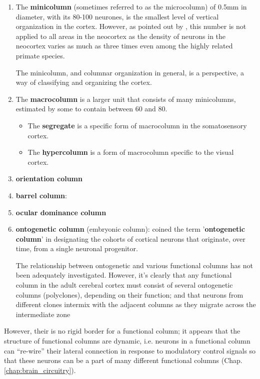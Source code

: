 \begin{enumerate}
  \item The {\bf minicolumn} (sometimes referred to as the microcolumn) of
  0.5mm in diameter, with its 80-100 neurones, is the smallest level of vertical
  organization in the cortex.
However, as pointed out by \citep{house2008, rakic2008}, this number is not
applied to all areas in the neocortex as the density of neurons in the neocortex
varies as much as three times even among the highly related primate species.

The minicolumn, and columnar organization in general, is a perspective, a way of
classifying and organizing the cortex.

\item  The {\bf macrocolumn} is a larger unit that consists of many minicolumns,
estimated by some to contain between 60 and 80.

\begin{itemize}
  \item The {\bf segregate} is a specific form of macrocolumn in the somatosensory cortex.

  \item The {\bf hypercolumn} is a form of macrocolumn specific to the visual
  cortex.
\end{itemize}


  \item {\bf orientation column}
  
  \item {\bf barrel column}:
  
  \item {\bf ocular dominance column}
  
  \item {\bf ontogenetic column} (embryonic column):
\citep{rakic2008} coined the term '{\bf ontogenetic column}' in designating the
cohorts of cortical neurons that originate, over time, from a single neuronal
progenitor. 

The relationship between ontogenetic and various functional columns has not been
adequately investigated. However, it's clearly that any functional column in the
adult cerebral cortex must consist of several ontogenetic columns (polyclones),
depending on their function; and that neurons from different clones intermix
with the adjacent columns as they migrate across the intermediate zone
  
\end{enumerate}


However, their is no rigid border for a functional column; it appears that the
structure of functional columns are dynamic, i.e. neurons in a functional column
can ``re-wire'' their lateral connection in response to modulatory control
signals so that these neurons can be a part of many different functional columns
(Chap.\ref{chap:brain_circuitry}).

